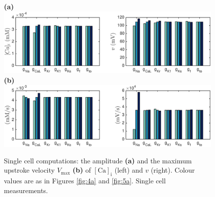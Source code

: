 \documentclass{article}
\begin{document}
\begin{figure}
 \textbf{(a)}  \includegraphics[trim=1cm 0cm 2cm 0cm, clip=true, width=1\linewidth]{sc_amplitude} 
 \textbf{(b)}  \includegraphics[trim=1cm 0cm 2cm 0cm, clip=true, width=1\linewidth]{sc_v_max} 
    \caption{Single cell computations: the amplitude \textbf{(a)} and the maximum upstroke velocity $V_{\mathrm{max}}$ \textbf{(b)} of $[\mathrm{Ca}]_{\mathrm{i}}$ (left) and $v$ (right).  Colour values are as in Figures \ref{fig:4a} and \ref{fig:5a}. Single cell measurements.}
    \label{fig:6a}
\end{figure}
%
\end{document}
